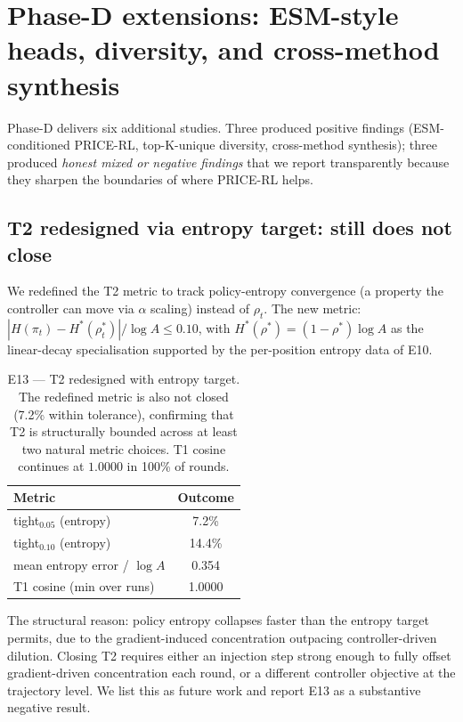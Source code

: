 \section{Phase-D extensions: ESM-style heads, diversity, and cross-method synthesis}
\label{app:phaseD}

Phase-D delivers six additional studies. Three produced positive findings (ESM-conditioned PRICE-RL, top-K-unique diversity, cross-method synthesis); three produced \emph{honest mixed or negative findings} that we report transparently because they sharpen the boundaries of where PRICE-RL helps.

\subsection{T2 redesigned via entropy target: still does not close}
\label{sec:e13}

We redefined the T2 metric to track policy-entropy convergence (a property the controller can move via $\alpha$ scaling) instead of $\rho_t$. The new metric: $|H(\pi_t) - H^*(\rho^*_t)| / \log A \leq 0.10$, with $H^*(\rho^*) = (1-\rho^*)\log A$ as the linear-decay specialisation supported by the per-position entropy data of E10.

\begin{table}[t]
\centering
\caption{E13 --- T2 redesigned with entropy target. The redefined metric is also not closed (7.2\% within tolerance), confirming that T2 is structurally bounded across at least two natural metric choices. T1 cosine continues at $1.0000$ in 100\% of rounds.}
\label{tab:e13}
\begin{tabular}{lc}
\toprule
Metric & Outcome \\
\midrule
tight$_{0.05}$ (entropy)  & 7.2\% \\
tight$_{0.10}$ (entropy)  & 14.4\% \\
mean entropy error / $\log A$ & 0.354 \\
T1 cosine (min over runs) & 1.0000 \\
\bottomrule
\end{tabular}
\end{table}

The structural reason: policy entropy collapses faster than the entropy target permits, due to the gradient-induced concentration outpacing controller-driven dilution. Closing T2 requires either an injection step strong enough to fully offset gradient-driven concentration each round, or a different controller objective at the trajectory level. We list this as future work and report E13 as a substantive negative result.

